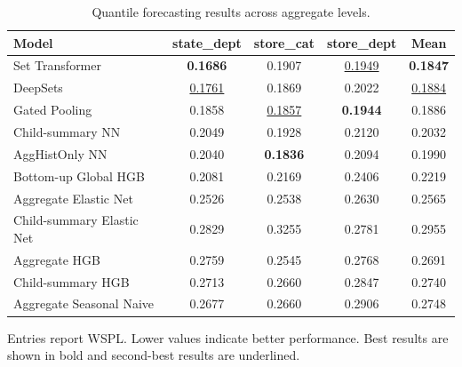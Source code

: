 \begin{table}[H]
\centering
\caption{Quantile forecasting results across aggregate levels.}
\label{tab:main_quantile}
\begin{threeparttable}
\begin{tabular}{lcccc}
\toprule
Model & state\_dept & store\_cat & store\_dept & Mean \\
\midrule
Set Transformer & \textbf{0.1686} & 0.1907 & \underline{0.1949} & \textbf{0.1847} \\
DeepSets & \underline{0.1761} & 0.1869 & 0.2022 & \underline{0.1884} \\
Gated Pooling & 0.1858 & \underline{0.1857} & \textbf{0.1944} & 0.1886 \\
Child-summary NN & 0.2049 & 0.1928 & 0.2120 & 0.2032 \\
AggHistOnly NN & 0.2040 & \textbf{0.1836} & 0.2094 & 0.1990 \\
Bottom-up Global HGB & 0.2081 & 0.2169 & 0.2406 & 0.2219 \\
Aggregate Elastic Net & 0.2526 & 0.2538 & 0.2630 & 0.2565 \\
Child-summary Elastic Net & 0.2829 & 0.3255 & 0.2781 & 0.2955 \\
Aggregate HGB & 0.2759 & 0.2545 & 0.2768 & 0.2691 \\
Child-summary HGB & 0.2713 & 0.2660 & 0.2847 & 0.2740 \\
Aggregate Seasonal Naive & 0.2677 & 0.2660 & 0.2906 & 0.2748 \\
\bottomrule
\end{tabular}
\begin{tablenotes}
\footnotesize \item Entries report WSPL. Lower values indicate better performance. Best results are shown in bold and second-best results are underlined.
\end{tablenotes}
\end{threeparttable}
\end{table}
